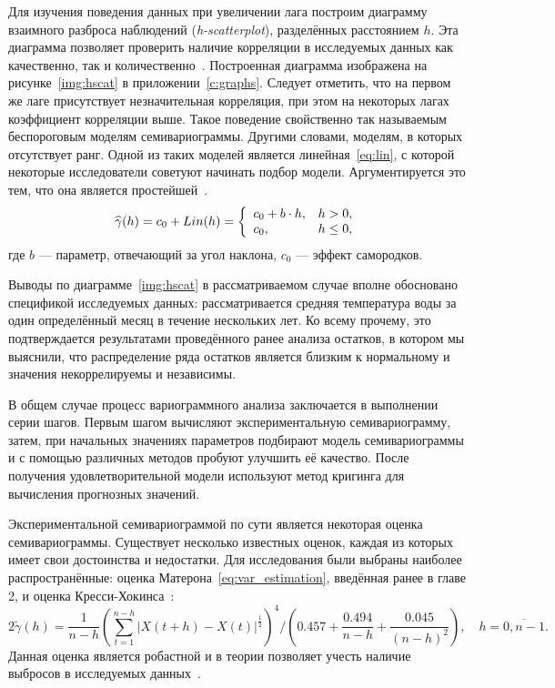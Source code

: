 Для изучения поведения данных при увеличении лага построим диаграмму взаимного разброса наблюдений (\textit{h-scatterplot}), разделённых расстоянием $ h $. Эта диаграмма позволяет проверить наличие корреляции в исследуемых данных как качественно, так и количественно~\cite{saveliev2012}. Построенная диаграмма изображена на рисунке~\ref{img:hscat} в приложении~\ref{c:graphs}. Следует отметить, что на первом же лаге присутствует незначительная корреляция, при этом на некоторых лагах коэффициент корреляции выше. Такое поведение свойственно так называемым беспороговым моделям семивариограммы. Другими словами, моделям, в которых отсутствует ранг. Одной из таких моделей является линейная~\eqref{eq:lin}, с которой некоторые исследователи советуют начинать подбор модели. Аргументируется это тем, что она является простейшей~\cite{saveliev2012}.
\begin{equation}
\label{eq:lin}
	\widehat{\gamma}(h) = c_0 + Lin(h) = \left\{
 \begin{array}{l l}
   c_0 + b \cdot h, & h > 0, \\
   c_0, & h \leq 0,
 \end{array} \right.
\end{equation}
где $ b $ --- параметр, отвечающий за угол наклона, $ c_0 $ --- эффект самородков.

Выводы по диаграмме~\ref{img:hscat} в рассматриваемом случае вполне обосновано спецификой исследуемых данных: рассматривается средняя температура воды за один определённый месяц в течение нескольких лет. Ко всему прочему, это подтверждается результатами проведённого ранее анализа остатков, в котором мы выяснили, что распределение ряда остатков является близким к нормальному и значения некоррелируемы и независимы.

В общем случае процесс вариограммного анализа заключается в выполнении серии шагов. Первым шагом вычисляют экспериментальную семивариограмму, затем, при начальных значениях параметров подбирают модель семивариограммы и с помощью различных методов пробуют улучшить её качество. После получения удовлетворительной модели используют метод кригинга для вычисления прогнозных значений.

Экспериментальной семивариограммой по сути является некоторая оценка семивариограммы. Существует несколько известных оценок, каждая из которых имеет свои достоинства и недостатки. Для исследования были выбраны наиболее распространённые: оценка Матерона~\eqref{eq:var_estimation}, введённая ранее в главе 2, и оценка Кресси-Хокинса~\cite{cressie1993statistics, dutter}:
\begin{equation}
\label{eq:cressie}
	2 \tilde{\gamma}(h) = \frac{1}{n - h} (\sum_{t = 1}^{n - h} | X(t + h) - X(t) |^{\frac{1}{2}} )^4 / (0.457 + \frac{0.494}{n - h} + \frac{0.045}{(n - h)^2}), \quad h = \overline{0, n - 1}.
\end{equation}
Данная оценка является робастной и в теории позволяет учесть наличие выбросов в исследуемых данных~\cite{MINGOTI2008}.

